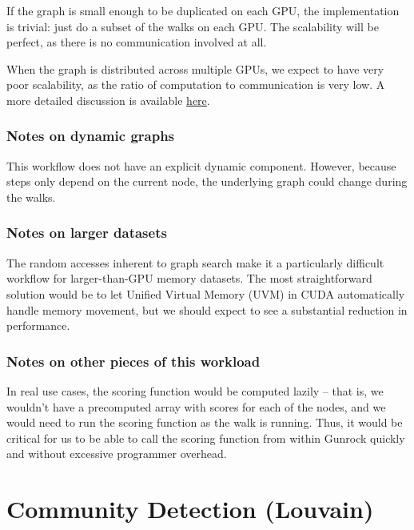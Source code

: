 \documentclass[10pt,oneside]{memoir}
\begin{document}
If the graph is small enough to be duplicated on each GPU, the
implementation is trivial: just do a subset of the walks on each GPU.
The scalability will be perfect, as there is no communication involved
at all.

When the graph is distributed across multiple GPUs, we expect to have
very poor scalability, as the ratio of computation to communication is
very low. A more detailed discussion is available
\href{https://gunrock.github.io/docs/hive_year1_summary.html\#scaling-analysis-for-hive-applications}{here}.

\hypertarget{notes-on-dynamic-graphs-3}{%
\subsection{Notes on dynamic graphs}\label{notes-on-dynamic-graphs-3}}

This workflow does not have an explicit dynamic component. However,
because steps only depend on the current node, the underlying graph
could change during the walks.

\hypertarget{notes-on-larger-datasets-3}{%
\subsection{Notes on larger datasets}\label{notes-on-larger-datasets-3}}

The random accesses inherent to graph search make it a particularly
difficult workflow for larger-than-GPU memory datasets. The most
straightforward solution would be to let Unified Virtual Memory (UVM) in
CUDA automatically handle memory movement, but we should expect to see a
substantial reduction in performance.

\hypertarget{notes-on-other-pieces-of-this-workload-3}{%
\subsection{Notes on other pieces of this
workload}\label{notes-on-other-pieces-of-this-workload-3}}

In real use cases, the scoring function would be computed lazily -- that
is, we wouldn't have a precomputed array with scores for each of the
nodes, and we would need to run the scoring function as the walk is
running. Thus, it would be critical for us to be able to call the
scoring function from within Gunrock quickly and without excessive
programmer overhead.

\hypertarget{community-detection-louvain-1}{%
\chapter{Community Detection
(Louvain)}\label{community-detection-louvain-1}}
\end{document}
